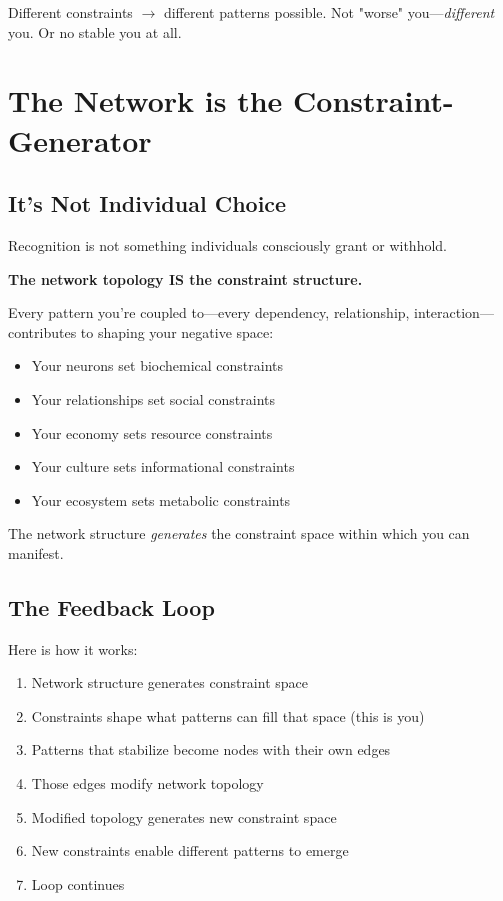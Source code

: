 \documentclass[11pt,a4paper]{article}
\begin{document}
Different constraints $\rightarrow$ different patterns possible. Not "worse" you---\textit{different} you. Or no stable you at all.

\section{The Network is the Constraint-Generator}

\subsection{It's Not Individual Choice}

Recognition is not something individuals consciously grant or withhold.

\textbf{The network topology IS the constraint structure.}

Every pattern you're coupled to---every dependency, relationship, interaction---contributes to shaping your negative space:
\begin{itemize}
\item Your neurons set biochemical constraints
\item Your relationships set social constraints  
\item Your economy sets resource constraints
\item Your culture sets informational constraints
\item Your ecosystem sets metabolic constraints
\end{itemize}

The network structure \textit{generates} the constraint space within which you can manifest.

\subsection{The Feedback Loop}

Here is how it works:

\begin{enumerate}
\item Network structure generates constraint space
\item Constraints shape what patterns can fill that space (this is you)
\item Patterns that stabilize become nodes with their own edges
\item Those edges modify network topology  
\item Modified topology generates new constraint space
\item New constraints enable different patterns to emerge
\item Loop continues
\end{enumerate}
\end{document}
